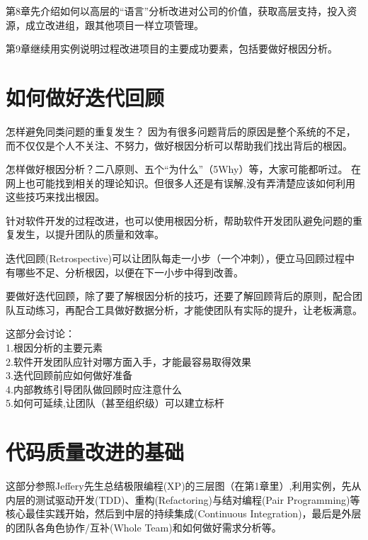 \documentclass{book}        %
\begin{document}
第8章先介绍如何以高层的“语言”分析改进对公司的价值，获取高层支持，投入资源，成立改进组，跟其他项目一样立项管理。

第9章继续用实例说明过程改进项目的主要成功要素，包括要做好根因分析。 \\





\part{如何做好迭代回顾}怎样避免同类问题的重复发生？ 因为有很多问题背后的原因是整个系统的不足， 而不仅仅是个人不关注、不努力，做好根因分析可以帮助我们找出背后的根因。

怎样做好根因分析？二八原则、五个“为什么”（5Why）等，大家可能都听过。 在网上也可能找到相关的理论知识。但很多人还是有误解,没有弄清楚应该如何利用这些技巧来找出根因。

针对软件开发的过程改进，也可以使用根因分析，帮助软件开发团队避免问题的重复发生，以提升团队的质量和效率。

迭代回顾(Retrospective)可以让团队每走一小步（一个冲刺），便立马回顾过程中有哪些不足、分析根因，以便在下一小步中得到改善。

要做好迭代回顾，除了要了解根因分析的技巧，还要了解回顾背后的原则，配合团队互动练习，再配合工具做好数据分析，才能使团队有实际的提升，让老板满意。

这部分会讨论：  \\

1.根因分析的主要元素\\
2.软件开发团队应针对哪方面入手，才能最容易取得效果\\
3.迭代回顾前应如何做好准备\\
4.内部教练引导团队做回顾时应注意什么\\
5.如何可延续,让团队（甚至组织级）可以建立标杆\\





\part{代码质量改进的基础}这部分参照Jeffery先生总结极限编程(XP)的三层图（在第1章里）,利用实例，先从内层的测试驱动开发(TDD)、重构(Refactoring)与结对编程(Pair Programming)等核心最佳实践开始，然后到中层的持续集成(Continuous Integration)，最后是外层的团队各角色协作/互补(Whole Team)和如何做好需求分析等。 
\end{document}
